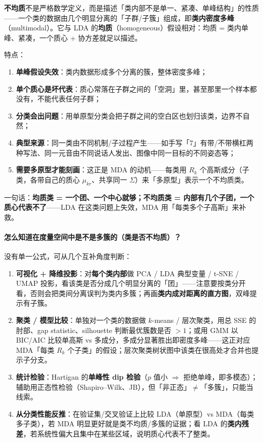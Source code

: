 \textbf{不均质}不是严格数学定义，而是描述「类内部不是单一、紧凑、单峰结构」的性质——一个类的数据由几个明显分离的「子群/子簇」组成，即\textbf{类内密度多峰}（multimodal）。它与 LDA 的\textbf{均质}（homogeneous）假设相对：均质 = 类内单峰、紧凑，一个质心 + 协方差就足以描述。

特点：

\begin{enumerate}
\item \textbf{单峰假设失效}：类内数据形成多个分离的簇，整体密度多峰；
\item \textbf{单个质心是坏代表}：质心常落在子群之间的「空洞」里，甚至那里一个样本都没有，不能代表任何子群；
\item \textbf{分类会出问题}：用单原型分类会把子群之间的空白区也划归该类，边界不自然；
\item \textbf{典型来源}：同一类由不同机制/子过程产生——如手写「7」有带/不带横杠两种写法、同一元音由不同说话人发出、图像中同一目标的不同姿态等；
\item \textbf{需要多原型才能刻画}：这正是 MDA 的动机——每类用 $R_k$ 个高斯成分（子类，各带自己的质心 $\mu_{kr}$、共享同一 $\Sigma$）来「多原型」表示一个不均质类。
\end{enumerate}

一句话：\textbf{均质类 = 一个团、一个中心就够；不均质类 = 内部有几个子团，一个质心代表不了}——LDA 在这类问题上失效，MDA 用「每类多个子高斯」来补救。

\paragraph{怎么知道在度量空间中是不是多簇的（类是否不均质）？}

没有单一公式，可从几个互补角度判断：

\begin{enumerate}
\item \textbf{可视化 + 降维投影}：对\textbf{每个类内部}做 PCA / LDA 典型变量 / t-SNE / UMAP 投影，看该类是否分成几个明显分离的「团」——注意要按类分开看，否则会把类间分离误判为类内多簇；再画\textbf{类内成对距离的直方图}，双峰提示有子簇。
\item \textbf{聚类 / 模型比较}：单独对一个类的数据做 $k$-means / 层次聚类，用总 SSE 的肘部、gap statistic、silhouette 判断最优簇数是否 $>1$；或用 GMM 以 BIC/AIC 比较单高斯 vs 多成分，多成分显著胜出即密度多峰——这正对应 MDA「每类 $R_k$ 个子类」的假设；层次聚类树状图中该类在很高处才合并也提示子分支。
\item \textbf{统计检验}：Hartigan 的\textbf{单峰性 dip 检验}（$p$ 值小 $\Rightarrow$ 拒绝单峰，即多模态）；辅助用正态性检验（Shapiro--Wilk、JB），但「非正态」$\neq$「多簇」，只能当线索。
\item \textbf{从分类性能反推}：在验证集/交叉验证上比较 LDA（单原型）vs MDA（每类多子类），若 MDA 明显更好就是类不均质/多簇的证据；看 LDA 的\textbf{类内残差}，若系统性偏大且集中在某些区域，说明质心代表不了整类。
\end{enumerate}

